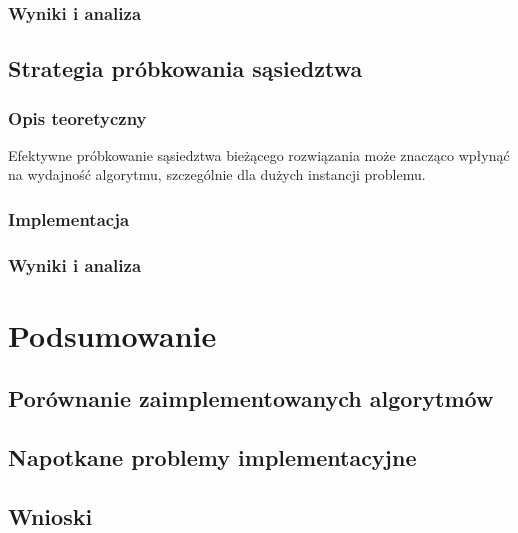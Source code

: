 \documentclass[12pt,a4paper]{article}
\begin{document}
\subsubsection{Wyniki i analiza}

\subsection{Strategia próbkowania sąsiedztwa}
\subsubsection{Opis teoretyczny}
Efektywne próbkowanie sąsiedztwa bieżącego rozwiązania może znacząco wpłynąć na wydajność algorytmu, szczególnie dla dużych instancji problemu.

\subsubsection{Implementacja}

\subsubsection{Wyniki i analiza}

\section{Podsumowanie}
\subsection{Porównanie zaimplementowanych algorytmów}

\subsection{Napotkane problemy implementacyjne}

\subsection{Wnioski}
\end{document}
